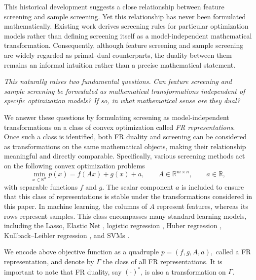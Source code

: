 This historical development suggests a close relationship between feature screening and sample screening. Yet this relationship has never been formulated mathematically. Existing work derives screening rules for particular optimization models rather than defining screening itself as a model-independent mathematical transformation. Consequently, although feature screening and sample screening are widely regarded as primal--dual counterparts, the duality between them remains an informal intuition rather than a precise mathematical statement.

\begin{center}
\emph{This naturally raises two fundamental questions. Can feature
screening and sample screening be formulated as mathematical
transformations independent of specific optimization models? If so, in
what mathematical sense are they dual?}
\end{center}


We answer these questions by formulating screening as
model-independent transformations on a class of convex optimization called \emph{FR representations}. 
Once such a class is identified, both
FR duality and screening can be considered as transformations on the same mathematical objects, making their relationship meaningful and directly comparable.
Specifically, various screening methods act on the following convex optimization problems
\[
    \min_{x\in\mathbb R^n}
    p(x)=f(Ax)+g(x)+a,
    \qquad
    A\in\mathbb R^{m\times n},
    \qquad
    a\in\mathbb R,
\]
with separable functions \(f\) and \(g\). The scalar component \(a\) is included to ensure that this class of representations is stable under the transformations considered in this paper.
In machine learning, the columns of \(A\) represent features, whereas
its rows represent samples.
This class encompasses many standard learning models, including the Lasso, Elastic Net \citep{guyard2022screen}, logistic regression \citep{wang2014safe}, Huber regression \citep{chen2020safe}, Kullback--Leibler regression \citep{dantas2021safe}, and SVMs \citep{zhai2020safe,nguyen2026gap}.



We encode above objective function as a quadruple
\(
p=(f,g,A,a),
\)
called a FR representation, and denote by
\(\Gamma\) the class of all FR representations.
It is important to note that FR duality, say \((\cdot)^*\), is also a transformation on \(\Gamma\).

